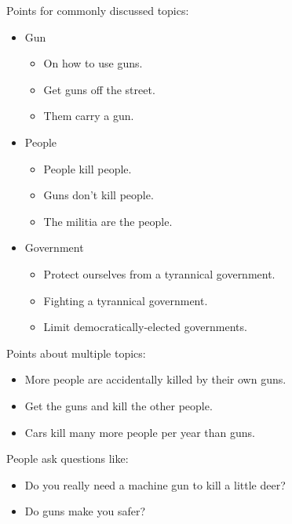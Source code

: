 \documentclass[tikz]{article}
\begin{document}
\begin{multicols}{2}
    Points for commonly discussed topics:
    \begin{itemize}[noitemsep,nolistsep,label={}]
      \item{Gun}
        \begin{itemize}[noitemsep,nolistsep,label={}]
		\item{On how to use guns.}
		\item{Get guns off the street.}
		\item{Them carry a gun.}
        \end{itemize}
      \item{People}
        \begin{itemize}[noitemsep,nolistsep,label={}]
		\item{People kill people.}
		\item{Guns don't kill people.}
		\item{The militia are the people.}
        \end{itemize}
      \item{Government}
        \begin{itemize}[noitemsep,nolistsep,label={}]
		\item{Protect ourselves from a tyrannical government.}
		\item{Fighting a tyrannical government.}
		\item{Limit democratically-elected governments.}
        \end{itemize}
    \end{itemize}

    Points about multiple topics:
    \begin{itemize}[noitemsep,nolistsep,label={}]
		\item{More people are accidentally killed by their own guns.}
		\item{Get the guns and kill the other people.}
		\item{Cars kill many more people per year than guns.}
    \end{itemize}

    People ask questions like:
    \begin{itemize}[noitemsep,nolistsep,label={}]
		\item{Do you really need a machine gun to kill a little deer?}
		\item{Do guns make you safer?}
    \end{itemize}

    \vfill
    \columnbreak


\end{multicols}
\end{document}
